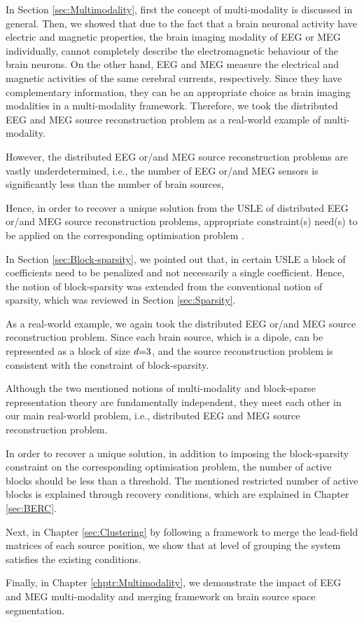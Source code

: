 In Section \ref{sec:Multimodality}, first the concept of multi-modality is discussed in general.
Then, we showed that due to the fact that a brain neuronal activity have electric and magnetic properties, the brain imaging modality of EEG or MEG individually, cannot completely describe the electromagnetic behaviour of the brain neurons.
On the other hand, EEG and MEG measure the electrical and magnetic activities of the same cerebral currents, respectively.
Since they have complementary information, they can be an appropriate choice as brain imaging modalities in a multi-modality framework. 
Therefore, we took the distributed EEG and MEG source reconstruction problem as a real-world example of multi-modality.

However, the distributed EEG or/and MEG source reconstruction problems are vastly underdetermined, i.e., the number of EEG or/and MEG sensors is significantly less than the number of brain sources, 

Hence, in order to recover a unique solution from the USLE of distributed EEG or/and MEG source reconstruction problems, appropriate constraint(s) need(s) to be applied on the corresponding optimisation problem .

In Section \ref{sec:Block-sparsity}, we pointed out that, in certain USLE a block of coefficients need to be penalized and not necessarily a single coefficient.
Hence, the notion of block-sparsity was extended from the conventional notion of sparsity, which was reviewed in Section \ref{sec:Sparsity}.

As a real-world example, we again took the distributed EEG or/and MEG source reconstruction problem.
Since each brain source, which is a dipole, can be represented as a block of size $d {=} 3$, and the source reconstruction problem is consistent with the constraint of block-sparsity.

Although the two mentioned notions of multi-modality and block-sparse representation theory are fundamentally independent, they meet each other in our main real-world problem, i.e., distributed EEG and MEG source reconstruction problem.

In order to recover a unique solution, in addition to imposing the block-sparsity constraint on the corresponding optimisation problem, the number of active blocks should be less than a threshold.
The mentioned restricted number of active blocks is explained through recovery conditions, which are explained in Chapter \ref{sec:BERC}.

Next, in Chapter \ref{sec:Clustering} by following a framework to merge the lead-field matrices of each source position, we show that at level of grouping  the system satisfies the existing conditions.
 
Finally, in Chapter \ref{chptr:Multimodality}, we demonstrate the impact of EEG and MEG multi-modality and merging framework on brain source space segmentation.